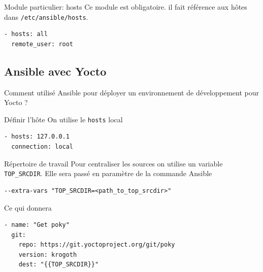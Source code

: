 \documentclass[compress]{smilebeamer}
\begin{document}
\begin{frame}[fragile]{Module particulier: hosts}
Ce module est obligatoire.\newline
il fait référence aux hôtes dans \texttt{/etc/ansible/hosts}.
\begin{lstlisting}[style=bitbake]
- hosts: all
  remote_user: root
\end{lstlisting}
\end{frame}

\subsection{Ansible avec Yocto}

\begin{frame}
\begin{center}
\textcolor{smileOrange}{\huge{Comment utilisé Ansible pour déployer un environnement de développement pour Yocto ?}}
\end{center}
\end{frame}

\begin{frame}[fragile]{Définir l'hôte}
On utilise le \texttt{hosts} local
\begin{lstlisting}[style=bitbake]
- hosts: 127.0.0.1
  connection: local
\end{lstlisting}
\end{frame}

\begin{frame}[fragile]{Répertoire de travail}
Pour centraliser les sources on utilise un variable \texttt{TOP\_SRCDIR}.\newline
Elle sera passé en paramètre de la commande Ansible
\begin{lstlisting}[style=shell]
--extra-vars "TOP_SRCDIR=<path_to_top_srcdir>"
\end{lstlisting}
Ce qui donnera
\begin{lstlisting}[style=bitbake]
- name: "Get poky"
  git:
    repo: https://git.yoctoproject.org/git/poky
    version: krogoth
    dest: "{{TOP_SRCDIR}}"
\end{lstlisting}
\end{frame}
\end{document}
